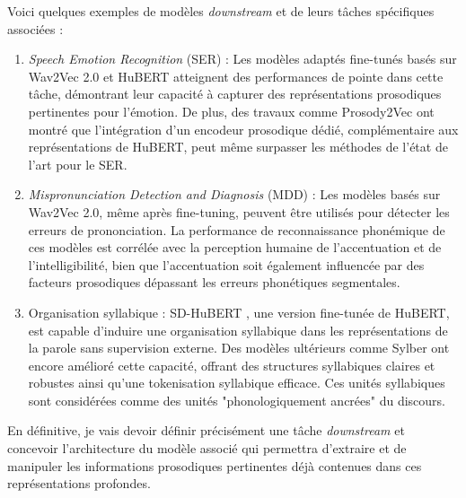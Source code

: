 \documentclass[11pt,a4paper]{article}
\begin{document}
Voici quelques exemples de modèles \textit{downstream} et de leurs tâches spécifiques associées :
\begin{enumerate}
    \item \textit{Speech Emotion Recognition} (SER) : Les modèles adaptés fine-tunés basés sur Wav2Vec 2.0 et HuBERT atteignent des performances de pointe dans cette tâche, démontrant leur capacité à capturer des représentations prosodiques pertinentes pour l'émotion. \cite{pepino2021emotionrecognitionspeechusing} De plus, des travaux comme Prosody2Vec \cite{qu2023disentanglingprosodyrepresentationsunsupervised} ont montré que l'intégration d'un encodeur prosodique dédié, complémentaire aux représentations de HuBERT, peut même surpasser les méthodes de l'état de l'art pour le SER. \newline

    \item \textit{Mispronunciation Detection and Diagnosis} (MDD) : Les modèles basés sur Wav2Vec 2.0, même après fine-tuning, peuvent être utilisés pour détecter les erreurs de prononciation. La performance de reconnaissance phonémique de ces modèles est corrélée avec la perception humaine de l'accentuation et de l'intelligibilité, bien que l'accentuation soit également influencée par des facteurs prosodiques dépassant les erreurs phonétiques segmentales. \cite{kheir2023automaticpronunciationassessment} \newline

    \item Organisation syllabique : SD-HuBERT \cite{cho2025sdhubertsentencelevelselfdistillationinduces}, une version fine-tunée de HuBERT, est capable d'induire une organisation syllabique dans les représentations de la parole sans supervision externe. Des modèles ultérieurs comme Sylber \cite{cho2025sylbersyllabicembeddingrepresentation} ont encore amélioré cette capacité, offrant des structures syllabiques claires et robustes ainsi qu'une tokenisation syllabique efficace. Ces unités syllabiques sont considérées comme des unités "phonologiquement ancrées" du discours.
    
\end{enumerate}

En définitive, je vais devoir définir précisément une tâche \textit{downstream} et concevoir l'architecture du modèle associé qui permettra d'extraire et de manipuler les informations prosodiques pertinentes déjà contenues dans ces représentations profondes.
\end{document}
